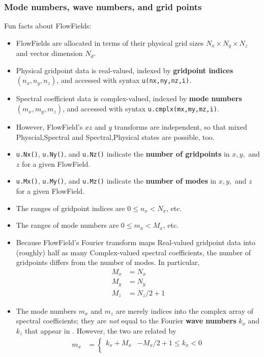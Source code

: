 \documentclass{article}[12pt]
\begin{document}
\subsubsection{Mode numbers, wave numbers, and grid points}

Fun facts about FlowFields:
\begin{itemize}
\item FlowFields are allocated in terms of their physical grid sizes
$N_x \times N_y \times N_z$ and vector dimension $N_d$.
\item Physical gridpoint data is real-valued, indexed by
{\bf gridpoint indices} $(n_x, n_y, n_z)$, and accessed with syntax
{\tt u(nx,ny,nz,i)}.
\item Spectral coefficient data is complex-valued, indexed by
{\bf mode numbers} $(m_x, m_y, m_z)$, and accessed with syntax
{\tt u.cmplx(mx,my,mz,i)}.
\item However, FlowField's $xz$ and $y$ transforms are independent,
so that mixed Physcial,Spectral and Spectral,Physical states are
possible, too.
\item {\tt u.Nx()}, {\tt u.Ny()}, and {\tt u.Nz()} indicate the
{\bf number of gridpoints} in $x,y,$ and $z$ for a given FlowField.
\item {\tt u.Mx()}, {\tt u.My()}, and {\tt u.Mz()} indicate the
{\bf number of modes} in $x,y,$ and $z$ for a given FlowField.
\item The ranges of gridpoint indices are $0 \leq n_x < N_x$, etc.
\item The ranges of mode numbers are  $0 \leq m_x < M_x$, etc.
\item Because FlowField's Fourier transform maps Real-valued gridpoint
data into (roughly) half as many Complex-valued spectral coefficients,
the number of gridpoints differs from the number of modes. In particular,
\begin{align}
M_x &= N_x \\
M_y &= N_y \\
M_z &= N_z/2+1
\end{align}
\item The mode numbers $m_x$ and $m_z$ are merely indices into the
complex array of spectral coefficients; they are {\em not} equal
to the Fourier {\bf wave numbers} $k_x$ and $k_z$ that appear in
. However, the two are related by
\begin{align}
m_x &= \begin{cases}
	k_x+M_x & -M_x/2+1 \leq k_x < 0 \\

\end{cases}
\end{align}
\end{itemize}
\end{document}
